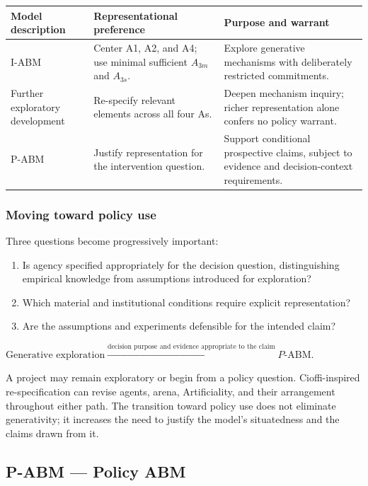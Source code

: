 \documentclass[11pt,a4paper]{article}
\newenvironment{fitdisplay}{\par\medskip\noindent\begin{lrbox}{\displaybox}$\displaystyle}{%
$\end{lrbox}\makebox[\linewidth][c]{\ifdim\wd\displaybox>\linewidth\resizebox{\linewidth}{!}{\usebox{\displaybox}}\else\usebox{\displaybox}\fi}\par\medskip}
\begin{document}
\noindent\begin{tabularx}{\linewidth}{@{}P{3.4cm}YY@{}}
\toprule
\textbf{Model description} & \textbf{Representational preference} & \textbf{Purpose and warrant}\\\midrule
I-ABM & Center A1, A2, and A4; use minimal sufficient $A_{3m}$ and $A_{3s}$. & Explore generative mechanisms with deliberately restricted commitments.\\
Further exploratory development & Re-specify relevant elements across all four As. & Deepen mechanism inquiry; richer representation alone confers no policy warrant.\\
P-ABM & Justify representation for the intervention question. & Support conditional prospective claims, subject to evidence and decision-context requirements.\\\bottomrule
\end{tabularx}

\subsubsection{Moving toward policy use}
Three questions become progressively important:
\begin{enumerate}
\item Is agency specified appropriately for the decision question, distinguishing empirical knowledge from assumptions introduced for exploration?
\item Which material and institutional conditions require explicit representation?
\item Are the assumptions and experiments defensible for the intended claim?
\end{enumerate}

\begin{fitdisplay}
\text{Generative exploration}
\xrightarrow{\text{decision purpose and evidence appropriate to the claim}}
P\text{-ABM}.
\end{fitdisplay}
A project may remain exploratory or begin from a policy question. Cioffi-inspired re-specification can revise agents, arena, Artificiality, and their arrangement throughout either path. The transition toward policy use does not eliminate generativity; it increases the need to justify the model's situatedness and the claims drawn from it.

\subsection{P-ABM --- Policy ABM}
\end{document}
